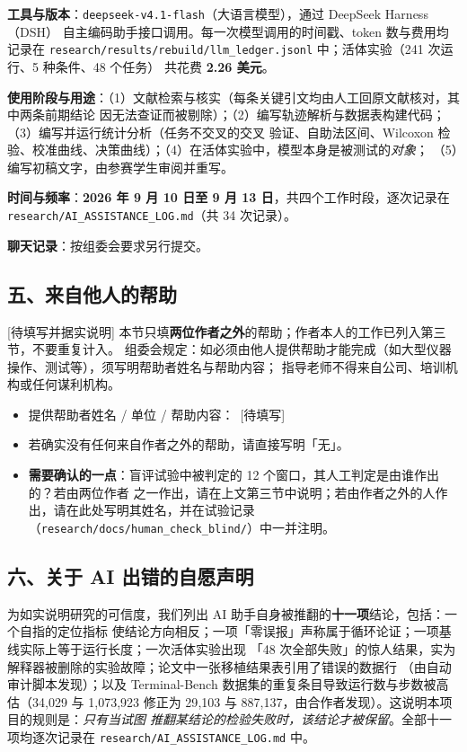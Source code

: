 \textbf{工具与版本}：\texttt{deepseek-v4.1-flash}（大语言模型），通过 DeepSeek Harness（DSH）
自主编码助手接口调用。每一次模型调用的时间戳、token 数与费用均记录在
\texttt{research/results/rebuild/llm\_ledger.jsonl} 中；活体实验（241 次运行、5 种条件、48 个任务）
共花费 \textbf{2.26 美元}。

\textbf{使用阶段与用途}：（1）文献检索与核实（每条关键引文均由人工回原文献核对，其中两条前期结论
因无法查证而被剔除）；（2）编写轨迹解析与数据表构建代码；（3）编写并运行统计分析（任务不交叉的交叉
验证、自助法区间、Wilcoxon 检验、校准曲线、决策曲线）；（4）在活体实验中，模型本身是被测试的\emph{对象}；
（5）编写初稿文字，由参赛学生审阅并重写。

\textbf{时间与频率}：\textbf{2026 年 9 月 10 日至 9 月 13 日}，共四个工作时段，逐次记录在
\texttt{research/AI\_ASSISTANCE\_LOG.md}（共 34 次记录）。

\textbf{聊天记录}：按组委会要求另行提交。

\subsection*{五、来自他人的帮助}

[待填写并据实说明] 本节只填\textbf{两位作者之外}的帮助；作者本人的工作已列入第三节，不要重复计入。
组委会规定：如必须由他人提供帮助才能完成（如大型仪器操作、测试等），须写明帮助者姓名与帮助内容；
指导老师不得来自公司、培训机构或任何谋利机构。

\begin{itemize}[leftmargin=1.3em,itemsep=2pt]
  \item 提供帮助者姓名 / 单位 / 帮助内容：\ [待填写]
  \item 若确实没有任何来自作者之外的帮助，请直接写明「无」。
  \item \textbf{需要确认的一点}：盲评试验中被判定的 12 个窗口，其人工判定是由谁作出的？若由两位作者
        之一作出，请在上文第三节中说明；若由作者之外的人作出，请在此处写明其姓名，并在试验记录
        （\texttt{research/docs/human\_check\_blind/}）中一并注明。
\end{itemize}

\subsection*{六、关于 AI 出错的自愿声明}

为如实说明研究的可信度，我们列出 AI 助手自身被推翻的\textbf{十一项}结论，包括：一个自指的定位指标
使结论方向相反；一项「零误报」声称属于循环论证；一项基线实际上等于运行长度；一次活体实验出现
「48 次全部失败」的惊人结果，实为解释器被删除的实验故障；论文中一张移植结果表引用了错误的数据行
（由自动审计脚本发现）；以及 Terminal-Bench 数据集的重复条目导致运行数与步数被高估（34{,}029 与
1{,}073{,}923 修正为 29{,}103 与 887{,}137，由合作者发现）。这说明本项目的规则是：\emph{只有当试图
推翻某结论的检验失败时，该结论才被保留}。全部十一项均逐次记录在
\texttt{research/AI\_ASSISTANCE\_LOG.md} 中。


